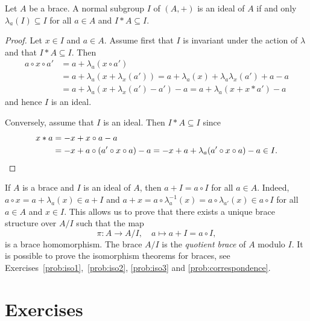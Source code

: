 \begin{proposition}
    \label{pro:I*A}
    Let $A$ be a brace. A normal subgroup $I$ of $(A,+)$
    is an ideal of $A$ if and only $\lambda_a(I)\subseteq I$ for all $a\in A$ and
    $I*A\subseteq I$.
\end{proposition}

\begin{proof}
    Let $x\in I$ and $a\in A$.  Assume first that $I$ is invariant under the
    action of $\lambda$ and that $I*A\subseteq I$. Then
    \begin{equation}
    \label{eq:trick:I*A}
        \begin{aligned}
        a\circ x\circ a' &=a+\lambda_a(x\circ a')\\
        &=a+\lambda_a(x+\lambda_x(a'))
        =a+\lambda_a(x)+\lambda_a\lambda_x(a')+a-a\\
        &=a+\lambda_a(x+\lambda_x(a')-a')-a
        =a+\lambda_a(x+x*a')-a
    \end{aligned}
    \end{equation}
    and hence $I$ is an ideal.

    Conversely, assume that $I$ is an ideal. Then $I*A\subseteq I$ since
    \begin{align*}
        x*a&=-x+x\circ a-a\\
        &=-x+a\circ(a'\circ x\circ a)-a
        =-x+a+\lambda_a(a'\circ x\circ a)-a\in I.\qedhere
    \end{align*}
\end{proof}


If $A$ is a brace and $I$ is an ideal of $A$, then $a+I=a\circ I$ for all $a\in A$. Indeed, 
$a\circ x=a+\lambda_a(x)\in a+I$ and 
$a+x=a\circ\lambda_a^{-1}(x)=a\circ\lambda_{a'}(x)\in a\circ I$ 
for all $a\in A$ and $x\in I$. 
This allows us to prove that there exists a unique brace structure over $A/I$ such that
the map 
\[
\pi\colon A\to A/I,
\quad
a\mapsto a+I=a\circ I,
\]
is a brace homomorphism. The brace $A/I$ is the \emph{quotient brace} of $A$ modulo $I$. It is possible
to prove the isomorphism theorems for braces, see Exercises~\ref{prob:iso1},~\ref{prob:iso2}, \ref{prob:iso3} and
\ref{prob:correspondence}.


\section*{Exercises}

